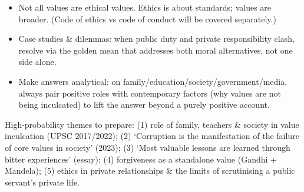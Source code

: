 \begin{itemize}
\item Not all values are ethical values. Ethics is about standards; values are broader. (Code of ethics vs code of conduct will be covered separately.)
\item Case studies \& dilemmas: when public duty and private responsibility clash, resolve via the golden mean that addresses both moral alternatives, not one side alone.
\item Make answers analytical: on family/education/society/government/media, always pair positive roles with contemporary factors (why values are not being inculcated) to lift the answer beyond a purely positive account.
\end{itemize}

\begin{PYQLink}
High-probability themes to prepare: (1) role of family, teachers \& society in value inculcation (UPSC 2017/2022); (2) `Corruption is the manifestation of the failure of core values in society' (2023); (3) `Most valuable lessons are learned through bitter experiences' (essay); (4) forgiveness as a standalone value (Gandhi + Mandela); (5) ethics in private relationships \& the limits of scrutinising a public servant's private life.
\end{PYQLink}
